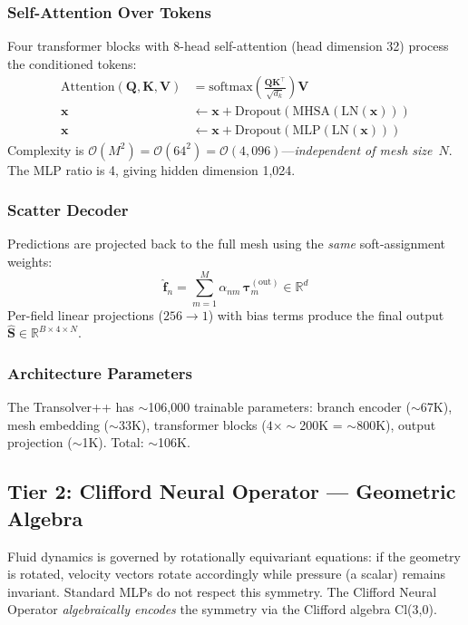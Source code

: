 \documentclass[conference]{IEEEtran}
\begin{document}
\subsubsection{Self-Attention Over Tokens}
Four transformer blocks with 8-head self-attention (head dimension 32) process the conditioned tokens:
\begin{align}
\text{Attention}(\bm{Q},\bm{K},\bm{V}) &= \text{softmax}\!\left(\frac{\bm{Q}\bm{K}^\top}{\sqrt{d_k}}\right)\bm{V} \label{eq:attn} \\
\bm{x} &\leftarrow \bm{x} + \text{Dropout}(\text{MHSA}(\text{LN}(\bm{x}))) \label{eq:res_attn} \\
\bm{x} &\leftarrow \bm{x} + \text{Dropout}(\text{MLP}(\text{LN}(\bm{x}))) \label{eq:res_mlp}
\end{align}
Complexity is $\mathcal{O}(M^2) = \mathcal{O}(64^2) = \mathcal{O}(4{,}096)$---\emph{independent of mesh size}~$N$. The MLP ratio is 4, giving hidden dimension 1,024.

\subsubsection{Scatter Decoder}
Predictions are projected back to the full mesh using the \emph{same} soft-assignment weights:
\begin{equation}
\hat{\bm{f}}_n = \sum_{m=1}^{M} \alpha_{nm}\,\bm{\tau}_m^{(\text{out})} \in \mathbb{R}^{d}
\label{eq:scatter}
\end{equation}
Per-field linear projections ($256 \to 1$) with bias terms produce the final output $\hat{\bm{S}} \in \mathbb{R}^{B \times 4 \times N}$.

\subsubsection{Architecture Parameters}
The Transolver++ has $\sim$106,000  trainable parameters: branch encoder ($\sim$67K), mesh embedding ($\sim$33K), transformer blocks ($4 \times \sim$200K = $\sim$800K), output projection ($\sim$1K). Total: $\sim$106K.

\subsection{Tier 2: Clifford Neural Operator --- Geometric Algebra}
\label{sec:clifford}

Fluid dynamics is governed by rotationally equivariant equations: if the geometry is rotated, velocity vectors rotate accordingly while pressure (a scalar) remains invariant. Standard MLPs do not respect this symmetry. The Clifford Neural Operator \cite{brandstetter2023clifford} \emph{algebraically encodes} the symmetry via the Clifford algebra Cl(3,0).
\end{document}
